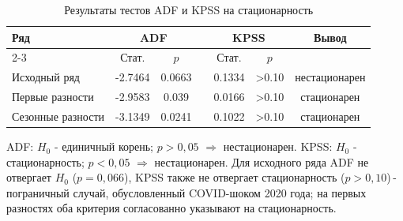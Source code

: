 \begin{table}[h!]
\centering
\caption{Результаты тестов ADF и KPSS на стационарность}
\label{tab:adf}
{\small
\setlength{\tabcolsep}{3.5pt}
\begin{tabular}{lcccccc}
\toprule
\multirow{2}{*}{Ряд} & \multicolumn{2}{c}{ADF} & & \multicolumn{2}{c}{KPSS} & \multirow{2}{*}{Вывод} \\
\cmidrule{2-3}\cmidrule{5-6}
 & Стат. & $p$ & & Стат. & $p$ & \\
\midrule
Исходный ряд & -2.7464 & 0.0663 & & 0.1334 & >0.10 & нестационарен \\
Первые разности & -2.9583 & 0.039 & & 0.0166 & >0.10 & стационарен \\
Сезонные разности & -3.1349 & 0.0241 & & 0.1022 & >0.10 & стационарен \\
\bottomrule
\end{tabular}}
\medskip\par\noindent
{\footnotesize
ADF: $H_0$ - единичный корень; $p>0{,}05$ $\Rightarrow$ нестационарен.
KPSS: $H_0$ - стационарность; $p<0{,}05$ $\Rightarrow$ нестационарен.
Для исходного ряда ADF не отвергает $H_0$ ($p=0{,}066$), KPSS также не отвергает стационарность
($p>0{,}10$)\,- пограничный случай, обусловленный COVID-шоком 2020 года;
на первых разностях оба критерия согласованно указывают на стационарность.}
\end{table}
